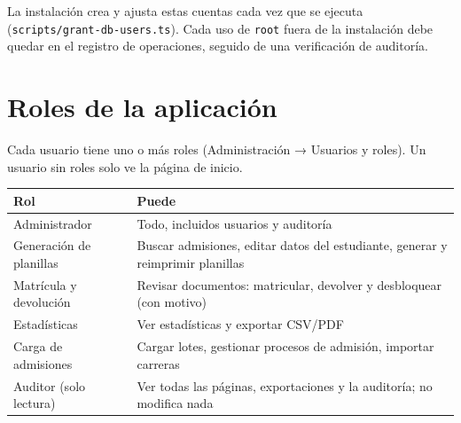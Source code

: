 La instalación crea y ajusta estas cuentas cada vez que se ejecuta
(\texttt{scripts/grant-db-users.ts}). Cada uso de \texttt{root} fuera de la instalación debe
quedar en el registro de operaciones, seguido de una verificación de auditoría.

\section{Roles de la aplicación}

Cada usuario tiene uno o más roles (Administración → Usuarios y roles). Un usuario sin roles
solo ve la página de inicio.

\begin{xltabular}{\linewidth}{@{}l L@{}}
	\toprule
	\textbf{Rol} & \textbf{Puede} \\
	\midrule
	\endhead
	Administrador & Todo, incluidos usuarios y auditoría \\
	Generación de planillas & Buscar admisiones, editar datos del estudiante, generar y reimprimir
	planillas \\
	Matrícula y devolución & Revisar documentos: matricular, devolver y desbloquear (con motivo) \\
	Estadísticas & Ver estadísticas y exportar CSV/PDF \\
	Carga de admisiones & Cargar lotes, gestionar procesos de admisión, importar carreras \\
	Auditor (solo lectura) & Ver todas las páginas, exportaciones y la auditoría; no modifica
	nada \\
	\bottomrule
\end{xltabular}
